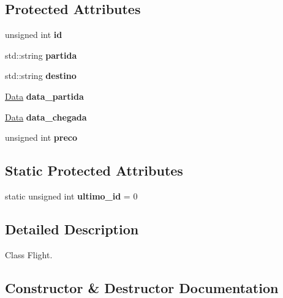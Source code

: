 \subsection*{Protected Attributes}
\begin{DoxyCompactItemize}
\item 
\mbox{\label{class_voo_a01b6990bb84d67c051cce97e9c6585a3}} 
unsigned int {\bfseries id}
\item 
\mbox{\label{class_voo_ae065b3c87eb582cd0d8245eb66d437f0}} 
std\+::string {\bfseries partida}
\item 
\mbox{\label{class_voo_a31e3a1b7684226fe8373bb82809cb882}} 
std\+::string {\bfseries destino}
\item 
\mbox{\label{class_voo_acdfc9e0af26777ef0f20a66d71c4a2e6}} 
\hyperlink{class_data}{Data} {\bfseries data\+\_\+partida}
\item 
\mbox{\label{class_voo_abe8e2b69ee694cb6d1255c30c13ebd24}} 
\hyperlink{class_data}{Data} {\bfseries data\+\_\+chegada}
\item 
\mbox{\label{class_voo_a21429e905a650d287661238f3441f7b4}} 
unsigned int {\bfseries preco}
\end{DoxyCompactItemize}
\subsection*{Static Protected Attributes}
\begin{DoxyCompactItemize}
\item 
\mbox{\label{class_voo_ac08289098fae01cb5686236a732c07b8}} 
static unsigned int {\bfseries ultimo\+\_\+id} = 0
\end{DoxyCompactItemize}


\subsection{Detailed Description}
Class Flight. 

\subsection{Constructor \& Destructor Documentation}
\mbox{\label{class_voo_ad580355f03578e40a7ae4387c9ef350b}} 
